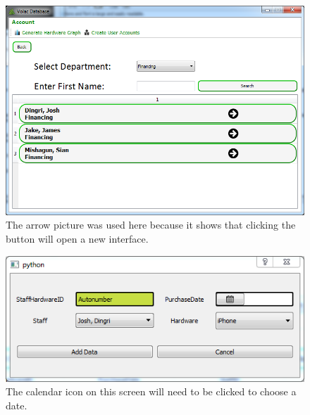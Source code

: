 \begin{figure}[H]
    \includegraphics[width=\textwidth]{./Evaluation/Images/arrowicon.png}
    \caption{The arrow picture was used here because it shows that clicking the button will open a new interface.} 
\end{figure}

\begin{figure}[H]
    \includegraphics[width=\textwidth]{./Evaluation/Images/calandericon.png}
    \caption{The calendar icon on this screen will need to be clicked to choose a date.} 
\end{figure}


